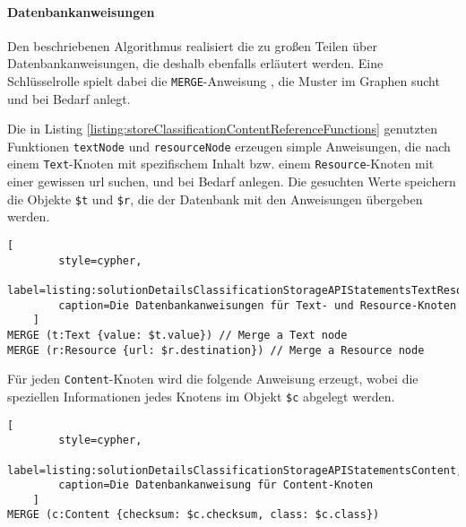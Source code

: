     \paragraph*{Datenbankanweisungen}
    Den beschriebenen Algorithmus realisiert die {\classificationStorageAPI}
    zu großen Teilen über Datenbankanweisungen,
    die deshalb ebenfalls erläutert werden.
    Eine Schlüsselrolle spielt dabei die \texttt{MERGE}-Anweisung \cite[Kapitel 3.3.16]{neo4j:documentation},
    die Muster im Graphen sucht und bei Bedarf anlegt.

    Die in Listing \ref{listing:storeClassificationContentReferenceFunctions} genutzten
    Funktionen \texttt{textNode} und \texttt{resourceNode} erzeugen simple Anweisungen,
    die nach einem \texttt{Text}-Knoten mit spezifischem Inhalt bzw.
    einem \texttt{Resource}-Knoten mit einer gewissen \gls{url} suchen,
    und bei Bedarf anlegen.
    Die gesuchten Werte speichern die Objekte \verb+$t+ und \verb+$r+,
    die der Datenbank mit den Anweisungen übergeben werden.

    \begin{lstlisting}[
        style=cypher,
        label=listing:solutionDetailsClassificationStorageAPIStatementsTextResource,
        caption=Die Datenbankanweisungen für Text- und Resource-Knoten
    ]
MERGE (t:Text {value: $t.value}) // Merge a Text node
MERGE (r:Resource {url: $r.destination}) // Merge a Resource node
    \end{lstlisting}

    Für jeden \texttt{Content}-Knoten wird die folgende Anweisung erzeugt,
    wobei die speziellen Informationen jedes Knotens im Objekt \verb+$c+
    abgelegt werden.

    \begin{lstlisting}[
        style=cypher,
        label=listing:solutionDetailsClassificationStorageAPIStatementsContent,
        caption=Die Datenbankanweisung für Content-Knoten
    ]
MERGE (c:Content {checksum: $c.checksum, class: $c.class})
    \end{lstlisting}

